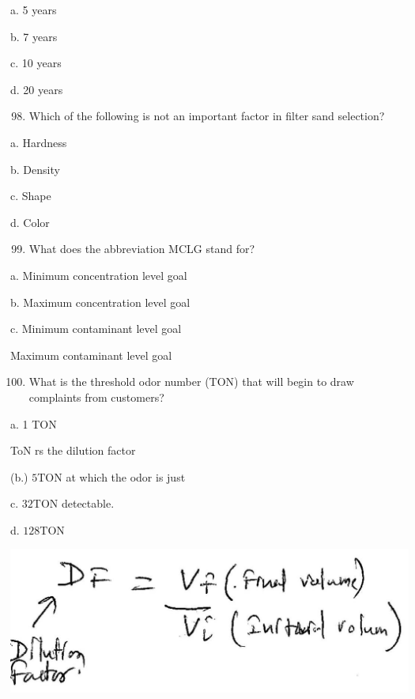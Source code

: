 \documentclass[10pt]{article}
\begin{document}
a. 5 years

b. 7 years

c. 10 years

d. 20 years

\begin{enumerate}
  \setcounter{enumi}{97}
  \item Which of the following is not an important factor in filter sand selection?
\end{enumerate}

a. Hardness

b. Density

c. Shape

d. Color

\begin{enumerate}
  \setcounter{enumi}{98}
  \item What does the abbreviation MCLG stand for?
\end{enumerate}

a. Minimum concentration level goal

b. Maximum concentration level goal

c. Minimum contaminant level goal

Maximum contaminant level goal

\begin{enumerate}
  \setcounter{enumi}{99}
  \item What is the threshold odor number (TON) that will begin to draw complaints from customers?
\end{enumerate}

a. 1 TON

ToN rs the dilution factor

(b.) $5 \mathrm{TON}$ at which the odor is just

c. $32 \mathrm{TON}$ detectable.

d. $128 \mathrm{TON}$

\includegraphics[max width=\textwidth]{2022_11_11_ca6a6c1a0324ee23e523g-69}
\end{document}
